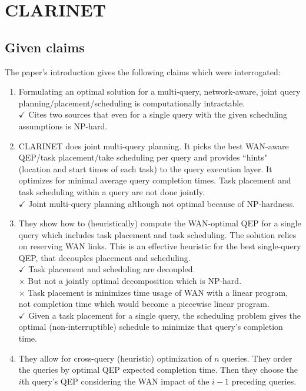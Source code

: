 \section{CLARINET}

\subsection{Given claims}

The paper's introduction gives the following claims which were interrogated:

\begin{enumerate}
	\item Formulating an optimal solution for a multi-query, network-aware, joint query planning/placement/scheduling is computationally intractable. \\
	$\checkmark$ Cites two sources that even for a single query with the given scheduling assumptions is NP-hard.
	\item CLARINET does joint multi-query planning.
	It picks the best WAN-aware QEP/task placement/take scheduling per query and provides ``hints" (location and start times of each task) to the query execution layer.
	It optimizes for minimal average query completion times.
	Task placement and task scheduling within a query are not done jointly.\\
	$\checkmark$ Joint multi-query planning although not optimal because of NP-hardness.
	\item They show how to (heuristically) compute the WAN-optimal QEP for a single query which includes task placement and task scheduling.
	The solution relies on reserving WAN links.
	This is an effective heuristic for the best single-query QEP, that decouples placement and scheduling.\\
	$\checkmark$ Task placement and scheduling are decoupled.\\ 
	$\times$ But not a jointly optimal decomposition which is NP-hard. \\
	$\times$ Task placement is minimizes time usage of WAN with a linear program, not completion time which would become a piecewise linear program. \\
	$\checkmark$ Given a task placement for a single query, the scheduling problem gives the optimal (non-interruptible) schedule to minimize that query's completion time.
	\item They allow for cross-query (heuristic) optimization of $n$ queries.
	They order the queries by optimal QEP expected completion time.
	Then they choose the $i$th query's QEP considering the WAN impact of the $i-1$ preceding queries.

\end{enumerate}
